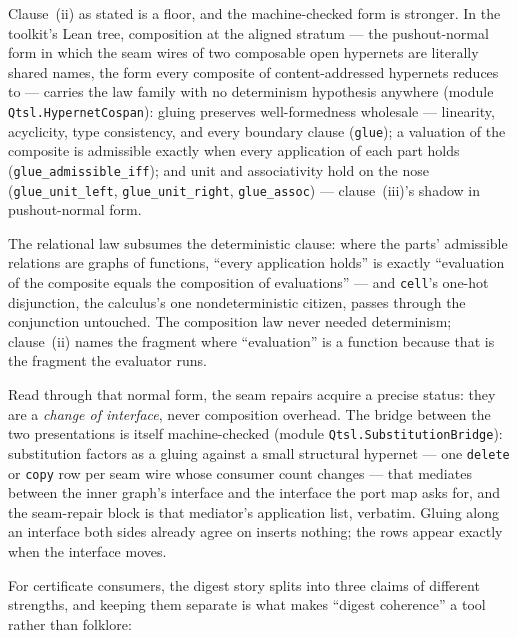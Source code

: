 Clause~(ii) as stated is a floor, and the machine-checked form is
stronger. In the toolkit's Lean tree, composition at the aligned
stratum --- the pushout-normal form in which the seam wires of two
composable open hypernets are literally shared names, the form every
composite of content-addressed hypernets reduces to --- carries the
law family with no determinism hypothesis anywhere (module
\texttt{Qtsl.HypernetCospan}): gluing preserves well-formedness
wholesale --- linearity, acyclicity, type consistency, and every
boundary clause (\texttt{glue}); a valuation of the composite is
admissible exactly when every application of each part holds
(\texttt{glue\_admissible\_iff}); and unit and associativity hold on
the nose (\texttt{glue\_unit\_left}, \texttt{glue\_unit\_right},
\texttt{glue\_assoc}) --- clause~(iii)'s shadow in pushout-normal
form.

The relational law subsumes the deterministic clause: where the
parts' admissible relations are graphs of functions, ``every
application holds'' is exactly ``evaluation of the composite equals
the composition of evaluations'' --- and \texttt{cell}'s one-hot
disjunction, the calculus's one nondeterministic citizen, passes
through the conjunction untouched. The composition law never needed
determinism; clause~(ii) names the fragment where ``evaluation'' is
a function because that is the fragment the evaluator runs.

Read through that normal form, the seam repairs acquire a precise
status: they are a \emph{change of interface}, never composition
overhead. The bridge between the two presentations is itself
machine-checked (module \texttt{Qtsl.SubstitutionBridge}):
substitution factors as a gluing against a small structural hypernet
--- one \texttt{delete} or \texttt{copy} row per seam wire whose
consumer count changes --- that mediates between the inner graph's
interface and the interface the port map asks for, and the
seam-repair block is that mediator's application list, verbatim.
Gluing along an interface both sides already agree on inserts
nothing; the rows appear exactly when the interface moves.

For certificate consumers, the digest story splits into three claims
of different strengths, and keeping them separate is what makes
``digest coherence'' a tool rather than folklore:

